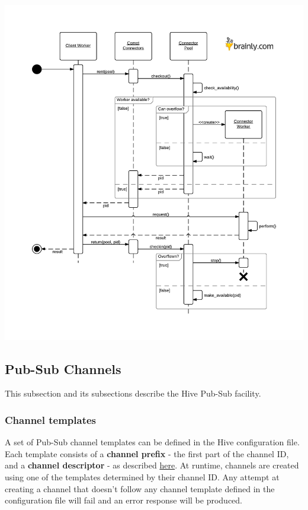 \documentclass[a4paper]{article}
\begin{document}
\begin{center}
\includegraphics[scale=0.9]{./img/connectors.pdf}
\end{center}
\subsection{Pub-Sub Channels}
\label{sec-7-3}
\label{ref-pubsub}

This subsection and its subsections describe the Hive Pub-Sub facility.
\subsubsection{Channel templates}
\label{sec-7-3-1}

A set of Pub-Sub channel templates can be defined in the Hive configuration file. Each template consists of a \textbf{channel prefix} - the first part of the channel ID, and a \textbf{channel descriptor} - as described \hyperref[ref-pubsub_config]{here}. At runtime, channels are created using one of the templates determined by their channel ID. Any attempt at creating a channel that doesn't follow any channel template defined in the configuration file will fail and an error response will be produced.
\end{document}
